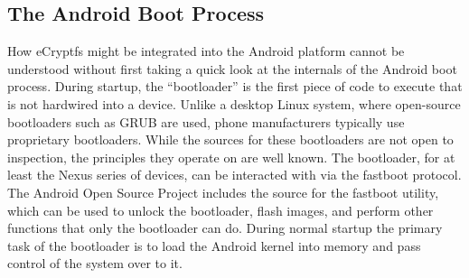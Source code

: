 \subsection{The Android Boot Process} How eCryptfs might be integrated into the Android platform cannot be understood without first
taking a quick look at the internals of the Android boot process. During startup, the ``bootloader'' is the first piece of code to
execute that is not hardwired into a device. Unlike a desktop Linux system, where open-source bootloaders such as GRUB are used,
phone manufacturers typically use proprietary bootloaders. While the sources for these bootloaders are not open to inspection, the
principles they operate on are well known. The bootloader, for at least the Nexus series of devices, can be interacted with via the
fastboot protocol. The Android Open Source Project includes the source for the fastboot utility, which can be used
to unlock the bootloader, flash images, and perform other functions that only the bootloader can do.  During normal startup the
primary task of the bootloader is to load the Android kernel into memory and pass control of the system over to it. 


